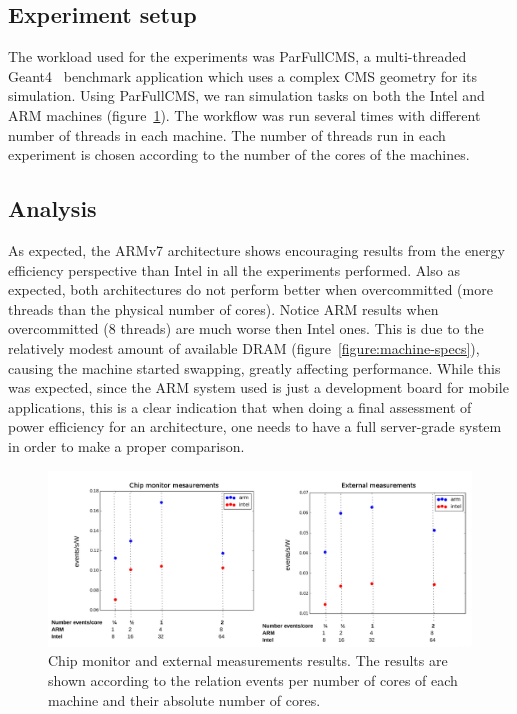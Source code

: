 \documentclass[a4paper]{jpconf}
\begin{document}
\subsection{Experiment setup}

The workload used for the experiments was ParFullCMS, a multi-threaded
Geant4~\cite{GEANT4} benchmark application which uses a complex CMS
geometry for its simulation. Using ParFullCMS, we ran simulation
tasks on both the Intel and ARM machines 
(figure~\ref{fig:parfull-cms-benchmark}).  The workflow was run several times
with different number of threads in each machine. The number of
threads run in each experiment is chosen according to the number of
the cores of the machines.

\subsection{Analysis}

As expected, the ARMv7 architecture shows encouraging results from
the energy efficiency perspective than Intel in all the experiments
performed. Also as expected, both architectures do not perform
better when overcommitted (more threads than the physical number
of cores).  Notice ARM results when overcommitted
(8 threads) are much worse then Intel ones. This is due to the relatively 
modest amount of available DRAM (figure~\ref{figure:machine-specs}), causing 
the machine started swapping,
greatly affecting performance. While this was expected, since the
ARM system used is just a development board for mobile applications,
this is a clear indication that when doing a final assessment of
power efficiency for an architecture, one needs to have a full 
server-grade system in order to make a proper comparison.

\begin{figure}[tbp]
\centering
\includegraphics[width=170mm]{img/results1.png}
\caption{Chip monitor and external measurements results. The results are shown
according to the relation events per number of cores of each machine and their
absolute number of cores. }
\label{fig:parfull-cms-benchmark}
\end{figure}
\end{document}
